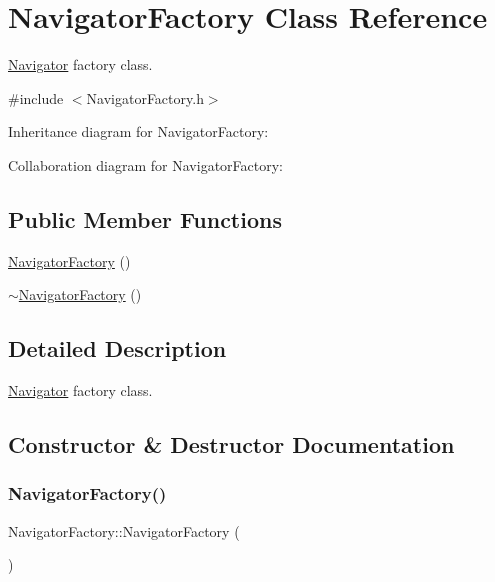 \hypertarget{classNavigatorFactory}{}\section{Navigator\+Factory Class Reference}
\label{classNavigatorFactory}


\hyperlink{classNavigator}{Navigator} factory class.  




{\ttfamily \#include $<$Navigator\+Factory.\+h$>$}



Inheritance diagram for Navigator\+Factory\+:


Collaboration diagram for Navigator\+Factory\+:
\subsection*{Public Member Functions}
\begin{DoxyCompactItemize}
\item 
\hyperlink{classNavigatorFactory_a6dffc936447428b43de6432c3684f43e}{Navigator\+Factory} ()
\item 
\hyperlink{classNavigatorFactory_a761b19635335f0d772196005e443ebd3}{$\sim$\+Navigator\+Factory} ()
\end{DoxyCompactItemize}


\subsection{Detailed Description}
\hyperlink{classNavigator}{Navigator} factory class. 

\subsection{Constructor \& Destructor Documentation}
\mbox{\label{classNavigatorFactory_a6dffc936447428b43de6432c3684f43e}} 
\subsubsection{\texorpdfstring{Navigator\+Factory()}{NavigatorFactory()}}
{\footnotesize\ttfamily Navigator\+Factory\+::\+Navigator\+Factory (\begin{DoxyParamCaption}{ }\end{DoxyParamCaption})}

